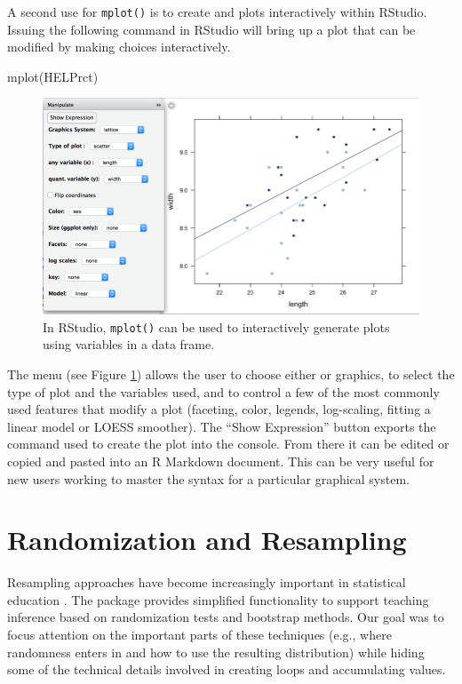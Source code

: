 A second use for \texttt{mplot()} is to create  and
 plots interactively within RStudio. Issuing the following
command in RStudio will bring up a plot that can be modified by making
choices interactively.

\begin{Schunk}
\begin{Sinput}
mplot(HELPrct)
\end{Sinput}
\end{Schunk}

\begin{figure}
\includegraphics{half-mplot.png}
\caption{In RStudio, \texttt{mplot()} can be used to interactively generate 
plots using variables in a data frame.}
\label{fig:mplot}
\end{figure}

\noindent
The menu (see Figure \ref{fig:mplot}) allows the user to choose either
 or  graphics, to select the type of plot and
the variables used, and to control a few of the most commonly used
features that modify a plot (faceting, color, legends, log-scaling,
fitting a linear model or LOESS smoother). The ``Show Expression''
button exports the command used to create the plot into the console.
From there it can be edited or copied and pasted into an R Markdown
document. This can be very useful for new users working to master the
syntax for a particular graphical system.

\section{Randomization and
Resampling}\label{randomization-and-resampling}

Resampling approaches have become increasingly important in statistical
education \citep{Tintle:TAS:2015, Hesterberg:2015}. The 
package provides simplified functionality to support teaching inference
based on randomization tests and bootstrap methods. Our goal was to
focus attention on the important parts of these techniques (e.g., where
randomness enters in and how to use the resulting distribution) while
hiding some of the technical details involved in creating loops and
accumulating values.

